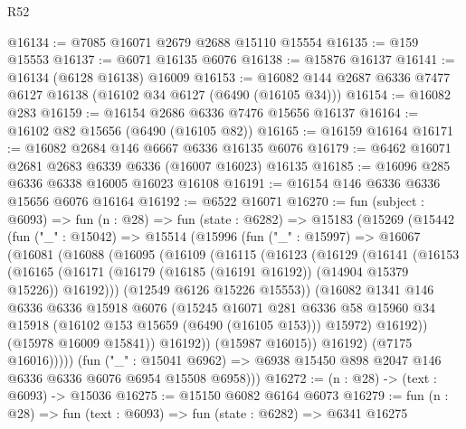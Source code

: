 \begin{lexlean}{R52}
\begin{coremodule}
@16134 := @7085 @16071 @2679 @2688 @15110 @15554
@16135 := @159 @15553
@16137 := @6071 @16135 @6076
@16138 := @15876 @16137
@16141 := @16134 (@6128 @16138) @16009
@16153 := @16082 @144 @2687 @6336 @7477 @6127 @16138 (@16102 @34 @6127 (@6490 (@16105 @34)))
@16154 := @16082 @283
@16159 := @16154 @2686 @6336 @7476 @15656 @16137
@16164 := @16102 @82 @15656 (@6490 (@16105 @82))
@16165 := @16159 @16164
@16171 := @16082 @2684 @146 @6667 @6336 @16135 @6076
@16179 := @6462 @16071 @2681 @2683 @6339 @6336 (@16007 @16023) @16135
@16185 := @16096 @285 @6336 @6338 @16005 @16023 @16108
@16191 := @16154 @146 @6336 @6336 @15656 @6076 @16164
@16192 := @6522 @16071
@16270 := fun (subject : @6093) =>
  fun (n : @28) =>
  fun (state : @6282) =>
  @15183
    (@15269
      (@15442
        (fun ("_" : @15042) =>
        @15514
          (@15996
            (fun ("_" : @15997) =>
            @16067
              (@16081
                (@16088
                  (@16095
                    (@16109
                      (@16115
                        (@16123
                          (@16129
                            (@16141
                              (@16153
                                (@16165
                                  (@16171
                                    (@16179 (@16185 (@16191 @16192)) (@14904 @15379 @15226))
                                    @16192)))
                              (@12549 @6126 @15226 @15553))
                            (@16082
                              @1341
                              @146
                              @6336
                              @6336
                              @15918
                              @6076
                              (@15245
                                @16071
                                @281
                                @6336
                                @58
                                @15960
                                @34
                                @15918
                                (@16102 @153 @15659 (@6490 (@16105 @153)))
                                @15972)
                              @16192))
                          (@15978 @16009 @15841))
                        @16192))
                    (@15987 @16015))
                  @16192)
                (@7175 @16016)))))
        (fun ("_" : @15041 @6962) =>
        @6938 @15450 @898 @2047 @146 @6336 @6336 @6076 @6954 @15508 @6958)))
@16272 := (n : @28) -> (text : @6093) -> @15036
@16275 := @15150 @6082 @6164 @6073
@16279 := fun (n : @28) => fun (text : @6093) => fun (state : @6282) => @6341 @16275

\end{coremodule}
\end{lexlean}
